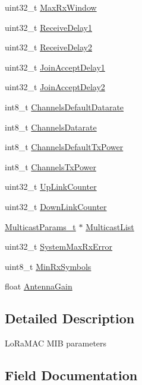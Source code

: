 \begin{DoxyCompactItemize}
\item 
uint32\+\_\+t \hyperlink{unionuMibParam_a9fdb2320488295a980588cb61f6fd5ea}{Max\+Rx\+Window}
\item 
uint32\+\_\+t \hyperlink{unionuMibParam_af36e0cb0f6077bf16d18e0563725eef4}{Receive\+Delay1}
\item 
uint32\+\_\+t \hyperlink{unionuMibParam_a8606ae0bf9c205d3cebb622986d1d291}{Receive\+Delay2}
\item 
uint32\+\_\+t \hyperlink{unionuMibParam_aa13344525c4bcb94ed4c59938f567b32}{Join\+Accept\+Delay1}
\item 
uint32\+\_\+t \hyperlink{unionuMibParam_ab5aab1064c3e6476fb342d30de7abc7b}{Join\+Accept\+Delay2}
\item 
int8\+\_\+t \hyperlink{unionuMibParam_a150339341b4c54a3e0779893c248a559}{Channels\+Default\+Datarate}
\item 
int8\+\_\+t \hyperlink{unionuMibParam_aae0c86fa530e987e280567342ed8181a}{Channels\+Datarate}
\item 
int8\+\_\+t \hyperlink{unionuMibParam_adad323d47a9d1913172b0f40b8581a11}{Channels\+Default\+Tx\+Power}
\item 
int8\+\_\+t \hyperlink{unionuMibParam_a553f5873284511d95ebc5473a48b473a}{Channels\+Tx\+Power}
\item 
uint32\+\_\+t \hyperlink{unionuMibParam_a832b6a7ceb162e04422c74ef84828359}{Up\+Link\+Counter}
\item 
uint32\+\_\+t \hyperlink{unionuMibParam_ab6a514e07df4b7d0b7df77362eb974d5}{Down\+Link\+Counter}
\item 
\hyperlink{group__LORAMAC_ga02d2523505cac70954c043074087ea65}{Multicast\+Params\+\_\+t} $\ast$ \hyperlink{unionuMibParam_a3a577a31c0893ac6058a554c3e894535}{Multicast\+List}
\item 
uint32\+\_\+t \hyperlink{unionuMibParam_a2f01cc5ba9dc1ae1a0a9ecb5ece418e5}{System\+Max\+Rx\+Error}
\item 
uint8\+\_\+t \hyperlink{unionuMibParam_a1eec512351464514fafd9860041b9f2a}{Min\+Rx\+Symbols}
\item 
float \hyperlink{unionuMibParam_a294b81422b95e51abf8dbaf10da230e2}{Antenna\+Gain}
\end{DoxyCompactItemize}


\subsection{Detailed Description}
Lo\+Ra\+M\+AC M\+IB parameters 

\subsection{Field Documentation}
\mbox{\label{unionuMibParam_ab178fe02b29604d3996b55e72ebc39b6}} 
